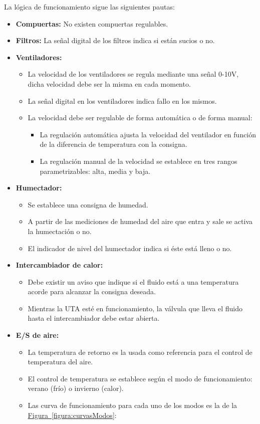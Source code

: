 La lógica de funcionamiento sigue las siguientes pautas:

\begin{itemize}
  \item \textbf{Compuertas:} No existen compuertas regulables.
  \item \textbf{Filtros:} La señal digital de los filtros indica si están sucios o no.
  \item \textbf{Ventiladores:} 
  \begin{itemize}
    \item La velocidad de los ventiladores se regula mediante una señal 0-10V, dicha velocidad debe ser la misma en cada momento.
    \item La señal digital en los ventiladores indica fallo en los mismos.
    \item La velocidad debe ser regulable de forma automática o de forma manual:
    \begin{itemize}
      \item La regulación automática ajusta la velocidad del ventilador en función de la diferencia de temperatura con la consigna.
      \item La regulación manual de la velocidad se establece en tres rangos parametrizables: alta, media y baja.
    \end{itemize}
  \end{itemize} 
  \item \textbf{Humectador:} 
  \begin{itemize}
    \item Se establece una consigna de humedad.
    \item A partir de las mediciones de humedad del aire que entra y sale se activa la humectación o no.
    \item El indicador de nivel del humectador indica si éste está lleno o no.
  \end{itemize}
  \item \textbf{Intercambiador de calor:}
  \begin{itemize}
    \item Debe existir un aviso que indique si el fluido está a una temperatura acorde para alcanzar la consigna deseada.
    \item Mientras la UTA esté en funcionamiento, la válvula que lleva el fluido hasta el intercambiador debe estar abierta.
  \end{itemize}
  \item \textbf{E/S de aire:}
  \begin{itemize}
    \item La temperatura de retorno es la usada como referencia para el control de temperatura del aire.
    \item El control de temperatura se establece según el modo de funcionamiento: verano (frío) o invierno (calor).
    \item Las curva de funcionamiento para cada uno de los modos es la de la \hyperref[figura:curvasModos]{Figura~\ref{figura:curvasModos}}:
  \end{itemize}
\end{itemize}

